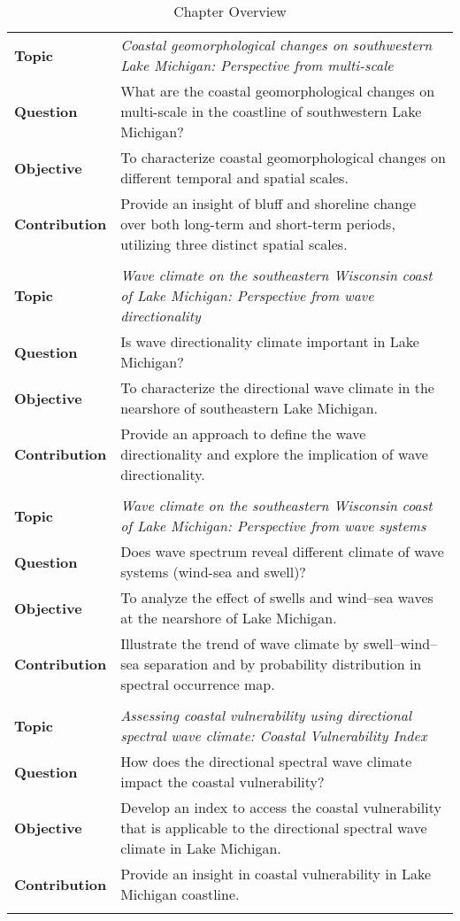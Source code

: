 \renewcommand{\arraystretch}{1.4}

\begin{longtable}{|>{\raggedright\arraybackslash}p{2.4cm}|p{12cm}|}
\caption{Chapter Overview} \\
\hline
\multicolumn{2}{|c|}{\textbf{Chapter 2}} \\
\hline
\textbf{Topic} & \textit{Coastal geomorphological changes on southwestern Lake Michigan: Perspective from multi-scale} \\
\textbf{Question} & What are the coastal geomorphological changes on multi-scale in the coastline of southwestern Lake Michigan? \\
\textbf{Objective} & To characterize coastal geomorphological changes on different temporal and spatial scales. \\
\textbf{Contribution} & Provide an insight of bluff and shoreline change over both long-term and short-term periods, utilizing three distinct spatial scales. \\
\hline
\multicolumn{2}{|c|}{\textbf{Chapter 3}} \\
\hline
\textbf{Topic} & \textit{Wave climate on the southeastern Wisconsin coast of Lake Michigan: Perspective from wave directionality} \\
\textbf{Question} & Is wave directionality climate important in Lake Michigan? \\
\textbf{Objective} & To characterize the directional wave climate in the nearshore of southeastern Lake Michigan. \\
\textbf{Contribution} & Provide an approach to define the wave directionality and explore the implication of wave directionality. \\
\hline
\multicolumn{2}{|c|}{\textbf{Chapter 4}} \\
\hline
\textbf{Topic} & \textit{Wave climate on the southeastern Wisconsin coast of Lake Michigan: Perspective from wave systems} \\
\textbf{Question} & Does wave spectrum reveal different climate of wave systems (wind-sea and swell)? \\
\textbf{Objective} & To analyze the effect of swells and wind–sea waves at the nearshore of Lake Michigan. \\
\textbf{Contribution} & Illustrate the trend of wave climate by swell–wind–sea separation and by probability distribution in spectral occurrence map. \\
\hline
\multicolumn{2}{|c|}{\textbf{Chapter 5}} \\
\hline
\textbf{Topic} & \textit{Assessing coastal vulnerability using directional spectral wave climate: Coastal Vulnerability Index} \\
\textbf{Question} & How does the directional spectral wave climate impact the coastal vulnerability? \\
\textbf{Objective} & Develop an index to access the coastal vulnerability that is applicable to the directional spectral wave climate in Lake Michigan. \\
\textbf{Contribution} & Provide an insight in coastal vulnerability in Lake Michigan coastline. \\
\hline
\label{overview}
\end{longtable}
